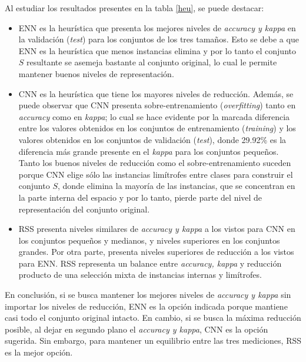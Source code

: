 Al estudiar los resultados presentes en la tabla \ref{heu}, se puede destacar:

\begin{itemize}

\item ENN es la heurística que presenta los mejores niveles de \emph{accuracy y kappa} en la validación (\emph{test}) para los conjuntos de los tres tamaños. Esto se debe a que ENN es la heurística que menos instancias elimina y por lo tanto el conjunto $S$ resultante se asemeja bastante al conjunto original, lo cual le permite mantener buenos niveles de representación.

\item CNN es la heurística que tiene los mayores niveles de reducción. Además, se puede observar que CNN presenta sobre-entrenamiento (\emph{overfitting}) tanto en \emph{accuracy} como en \emph{kappa}; lo cual se hace evidente por la marcada diferencia entre los valores obtenidos en los conjuntos de entrenamiento (\emph{training}) y los valores obtenidos en los conjuntos de validación (\emph{test}), donde 29.92\% es la diferencia más grande presente en el \emph{kappa} para los conjuntos pequeños. Tanto los buenos niveles de reducción como el sobre-entrenamiento suceden porque CNN elige sólo las instancias limítrofes entre clases para construir el conjunto $S$, donde elimina la mayoría de las instancias, que se concentran en la parte interna del espacio y por lo tanto, pierde parte del nivel de representación del conjunto original.

\item RSS presenta niveles similares de \emph{accuracy y kappa} a los vistos para CNN en los conjuntos pequeños y medianos, y niveles superiores en los conjuntos grandes. Por otra parte, presenta niveles superiores de reducción a los vistos para ENN. RSS representa un balance entre \emph{accuracy, kappa} y reducción producto de una selección mixta de instancias internas y limítrofes.


\end{itemize}

En conclusión, si se busca mantener los mejores niveles de \emph{accuracy y kappa} sin importar los niveles de reducción, ENN es la opción indicada porque mantiene casi todo el conjunto original intacto. En cambio, si se busca la máxima reducción posible, al dejar en segundo plano el \emph{accuracy y kappa}, CNN es la opción sugerida. Sin embargo, para mantener un equilibrio entre las tres mediciones, RSS es la mejor opción.

